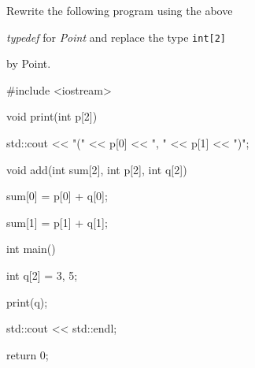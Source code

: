 Rewrite the following program using the above

\textit{typedef} for \textit{Point} and replace the type \verb!int[2]!

by Point.



\begin{consolethree}[escapeinside=||]

#include <iostream>



void print(int p[2])

{

    std::cout << "(" << p[0] << ", " << p[1] << ")";

}



void add(int sum[2], int p[2], int q[2])

{

    sum[0] = p[0] + q[0];

    sum[1] = p[1] + q[1];

}



int main()

{

    int q[2] = {3, 5};

    print(q);

    std::cout << std::endl;

    return 0;

}

\end{consolethree}

